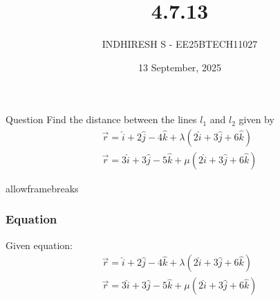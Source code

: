 \documentclass{beamer}
\title %
{4.7.13}
\date{13 September, 2025}
\author %
{INDHIRESH S - EE25BTECH11027}
\begin{document}
\frame{\titlepage}
\begin{frame}{Question}
 Find the distance between the lines $l_1$ and $l_2$ given by
\begin{align*}
    \overrightarrow{r}=\hat{i}+2\hat{j}-4\hat{k}+\lambda(2\hat{i}+3\hat{j}+6\hat{k})\\\overrightarrow{r}=3\hat{i}+3\hat{j}-5\hat{k}+\mu(2\hat{i}+3\hat{j}+6\hat{k})
\end{align*}
\end{frame}
\begin{frame}{allowframebreaks}
\frametitle{Equation}

    \centering
    
    \label{tab:parameters}
Given equation:
\begin{align}
   \Vec{r}=\hat{i}+2\hat{j}-4\hat{k}+\lambda(2\hat{i}+3\hat{j}+6\hat{k}) \\
\Vec{r}=3\hat{i}+3\hat{j}-5\hat{k}+\mu(2\hat{i}+3\hat{j}+6\hat{k})\\
\end{align}

   
\end{frame}
\end{document}
